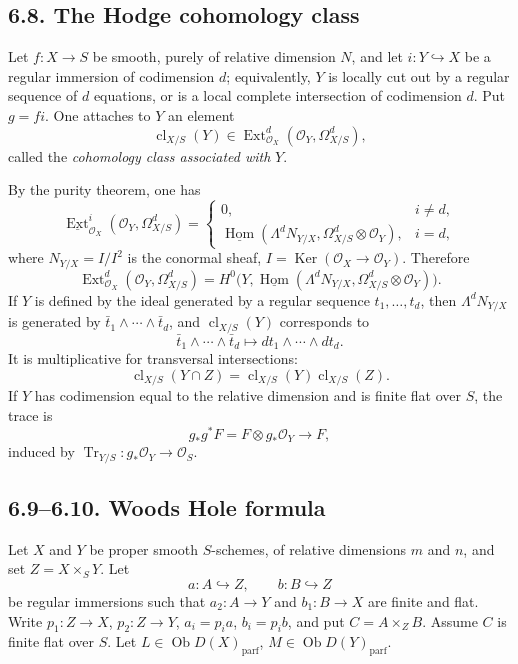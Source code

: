 \documentclass[12pt]{article}
\newcommand{\Hom}{\operatorname{Hom}}
\newcommand{\Ext}{\operatorname{Ext}}
\newcommand{\Tr}{\operatorname{Tr}}
\newcommand{\cl}{\operatorname{cl}}
\newcommand{\Ker}{\operatorname{Ker}}
\newcommand{\ob}{\operatorname{Ob}}
\newcommand{\cO}{\mathcal O}
\begin{document}
\subsection*{6.8. The Hodge cohomology class}
Let $f:X\to S$ be smooth, purely of relative dimension $N$, and let $i:Y\hookrightarrow X$ be a regular immersion of codimension $d$; equivalently, $Y$ is locally cut out by a regular sequence of $d$ equations, or is a local complete intersection of codimension $d$. Put $g=fi$. One attaches to $Y$ an element
\begin{equation}
   \cl_{X/S}(Y)\in\Ext^d_{\cO_X}(\cO_Y,\Omega^d_{X/S}),
   \tag{6.8.1}
\end{equation}
called the \emph{cohomology class associated with} $Y$.

By the purity theorem, one has
\begin{equation}
\underline{\Ext}^{i}_{\cO_X}(\cO_Y,\Omega^d_{X/S})=
\begin{cases}
0, & i\ne d,\\
\underline{\Hom}(\Lambda^dN_{Y/X},\Omega^d_{X/S}\otimes\cO_Y), & i=d,
\end{cases}
\tag{6.8.2}
\end{equation}
where $N_{Y/X}=I/I^2$ is the conormal sheaf, $I=\Ker(\cO_X\to\cO_Y)$. Therefore
\begin{equation}
\Ext^d_{\cO_X}(\cO_Y,\Omega^d_{X/S})=
H^0\bigl(Y,\underline{\Hom}(\Lambda^dN_{Y/X},\Omega^d_{X/S}\otimes\cO_Y)\bigr).
\tag{6.8.3}
\end{equation}
If $Y$ is defined by the ideal generated by a regular sequence $t_1,\ldots,t_d$, then $\Lambda^dN_{Y/X}$ is generated by $\bar t_1\wedge\cdots\wedge\bar t_d$, and $\cl_{X/S}(Y)$ corresponds to
\begin{equation}
   \bar t_1\wedge\cdots\wedge\bar t_d
   \longmapsto dt_1\wedge\cdots\wedge dt_d.
   \tag{6.8.5}
\end{equation}
It is multiplicative for transversal intersections:
\begin{equation}
   \cl_{X/S}(Y\cap Z)=\cl_{X/S}(Y)\cl_{X/S}(Z).
   \tag{6.8.6}
\end{equation}
If $Y$ has codimension equal to the relative dimension and is finite flat over $S$, the trace is
\begin{equation}
   g_*g^*F=F\otimes g_*\cO_Y\to F,
   \tag{6.8.7}
\end{equation}
induced by $\Tr_{Y/S}:g_*\cO_Y\to\cO_S$.

\subsection*{6.9--6.10. Woods Hole formula}
Let $X$ and $Y$ be proper smooth $S$-schemes, of relative dimensions $m$ and $n$, and set $Z=X\times_SY$. Let
\[
   a:A\hookrightarrow Z,
   \qquad
   b:B\hookrightarrow Z
\]
be regular immersions such that $a_2:A\to Y$ and $b_1:B\to X$ are finite and flat. Write $p_1:Z\to X$, $p_2:Z\to Y$, $a_i=p_ia$, $b_i=p_ib$, and put $C=A\times_ZB$. Assume $C$ is finite flat over $S$. Let $L\in\ob D(X)_{\mathrm{parf}}$, $M\in\ob D(Y)_{\mathrm{parf}}$.
\end{document}
